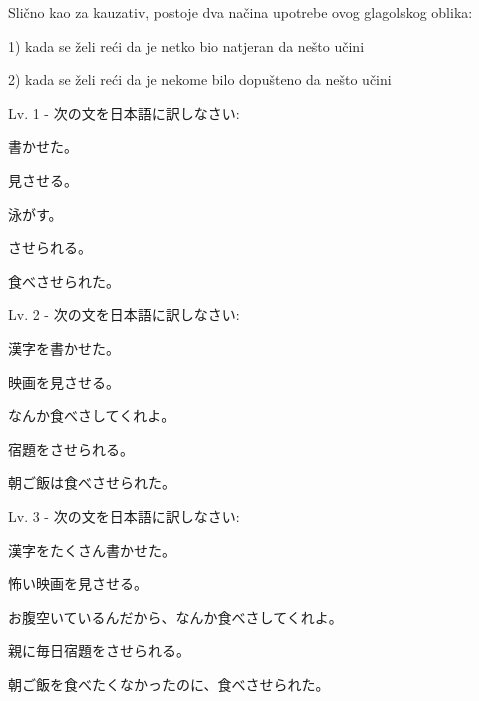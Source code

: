 	Slično kao za kauzativ, postoje dva načina upotrebe ovog glagolskog oblika:
	
	1) kada se želi reći da je netko bio natjeran da nešto učini
	
	2) kada se želi reći da je nekome bilo dopušteno da nešto učini\\
 
	\begin{reibun}
	\end{reibun}

	\newpage		
		
	\begin{mondai}{Lv. 1 - 次の文を日本語に訳しなさい: }
		\item 書かせた。
		\item 見させる。
		\item 泳がす。
		\item させられる。
		\item 食べさせられた。
	\end{mondai}
		
	\begin{mondai}{Lv. 2 - 次の文を日本語に訳しなさい: }
		\item 漢字を書かせた。
		\item 映画を見させる。
		\item なんか食べさしてくれよ。\footnotemark[1]
		\item 宿題をさせられる。
		\item 朝ご飯は食べさせられた。
	\end{mondai}
	
	\begin{mondai}{Lv. 3 - 次の文を日本語に訳しなさい: }
		\item 漢字をたくさん書かせた。
		\item 怖い映画を見させる。
		\item お腹空いているんだから、なんか食べさしてくれよ。
		\item 親に毎日宿題をさせられる。
		\item 朝ご飯を食べたくなかったのに、食べさせられた。
	\end{mondai}

